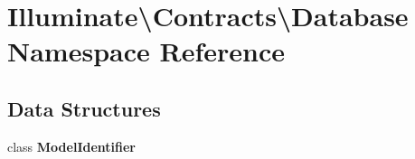 \section{Illuminate\textbackslash{}Contracts\textbackslash{}Database Namespace Reference}
\label{namespace_illuminate_1_1_contracts_1_1_database}
\subsection*{Data Structures}
\begin{DoxyCompactItemize}
\item 
class {\bf Model\+Identifier}
\end{DoxyCompactItemize}
